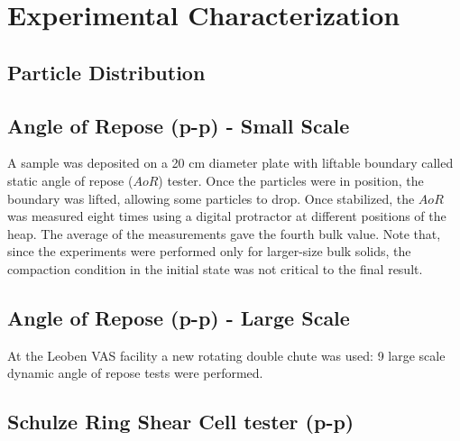 
\chapter[Experimental Characterization]{Experimental Characterization}
\label{cap:experimentalcharacterization}

\lipsum[1]



\section{Particle Distribution}
\label{sec:particledistribution}


\section{Angle of Repose (p-p) - Small Scale}
\label{sec:aor}


A sample was deposited on a 20 cm diameter plate with liftable boundary called
static angle of repose ($AoR$) tester.
Once the particles were in position, the boundary was lifted, allowing some particles to drop. 
Once stabilized, the $AoR$ was measured eight times using a digital protractor at different positions of the heap. 
The average of the measurements gave the fourth bulk value.
Note that, since the experiments were performed only for larger-size bulk
solids, the compaction condition in the initial state was not critical to the final result.

\section{Angle of Repose (p-p) - Large Scale}
\label{sec:aorlargescale}

At the Leoben VAS facility a new rotating double chute was used: 
9 large scale dynamic angle of repose tests were performed. 

\section{Schulze Ring Shear Cell tester (p-p)}
\label{sec:SRSCT}

